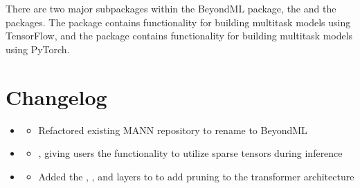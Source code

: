 \documentclass[letterpaper,10pt,english]{sphinxmanual}
\begin{document}
\sphinxAtStartPar
There are two major subpackages within the BeyondML package, the  and the  packages.
The  package contains functionality for building multitask models using TensorFlow, and the
 package contains functionality for building multitask models using PyTorch.


\chapter{Changelog}
\label{\detokenize{index:changelog}}\begin{itemize}
\item {} \begin{description}
\begin{itemize}
\item {} 
\sphinxAtStartPar
Refactored existing MANN repository to rename to BeyondML

\end{itemize}

\end{description}

\item {} \begin{description}
\begin{itemize}
\item {} \begin{description}
\sphinxAtStartPar
{}, giving users the functionality to utilize sparse tensors during
inference

\end{description}

\end{itemize}

\end{description}

\item {} \begin{description}
\begin{itemize}
\item {} 
\sphinxAtStartPar
Added the , , and  layers to  to add pruning to the transformer architecture


\end{itemize}
\end{description}
\end{itemize}
\end{document}
